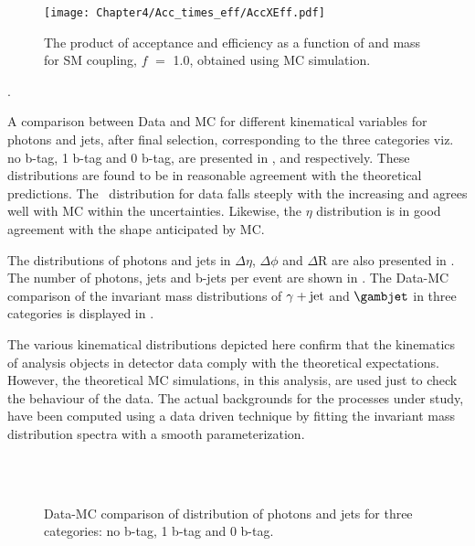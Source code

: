 \begin{figure}[htbp]
\centering
\texttt{[image: Chapter4/Acc\_times\_eff/AccXEff.pdf]}
\caption{The product of acceptance and efficiency as a function of \qstar and \bstar mass for SM coupling, $f$ $=$ 1.0, obtained using MC simulation.}
\label{fig:accEff}
\end{figure}
\vspace{-0.1in}

{\color{white}.}

A comparison between Data and MC for different kinematical variables for photons and jets,
after final selection, corresponding to the three categories viz. no b-tag, 1 b-tag and
0 b-tag, are presented in \fig{\ref{fig:PtDist}}, \fig{\ref{fig:EtaDist}} and \fig{\ref{fig:PhiDist}} respectively. These distributions are found to be in
reasonable agreement with the theoretical predictions. The \pt\ distribution for data falls steeply with the increasing \pt and agrees well with MC within the
uncertainties. Likewise, the $\eta$ distribution is in good agreement with the shape anticipated by MC. 

The distributions of photons and jets in $\Delta\eta$, $\Delta\phi$ and ${\Delta}$R are also presented in \fig{\ref{fig:deta}}. The number of photons,
jets and b-jets per event are shown in \fig{\ref{fig:mult}}. The Data-MC comparison of the invariant mass distributions of $\gamma+\mathrm{jet}$ and $\gambjet$
in three categories is displayed in \fig{\ref{fig:InvtMass_DataMC}}.

The various kinematical distributions depicted here confirm that the kinematics of analysis objects in detector data comply with the theoretical expectations.
However, the theoretical MC simulations, in this analysis, are used just to check the behaviour of the data. The actual backgrounds for the processes under study,
have been computed using a data driven technique by fitting the invariant mass distribution spectra with a smooth parameterization.

\begin{figure}[htbp]
\centering
{} \hspace{0.2in}
\\
 \hspace{0.2in}
\\
 \hspace{0.2in}
\caption{Data-MC comparison of \pt distribution of photons and jets for three categories: no b-tag, 1 b-tag and 0 b-tag.}
\label{fig:PtDist}
\end{figure}


